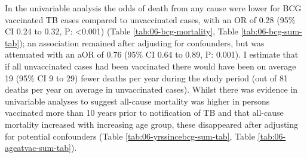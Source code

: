 \documentclass[11pt,twoside]{bristolthesis}
\begin{document}
  In the univariable analysis the odds of death from any cause were lower for BCG vaccinated TB cases compared to unvaccinated cases, with an OR of 0.28 (95\% CI 0.24 to 0.32, P: \textless{}0.001) (Table \ref{tab:06-bcg-mortality}, Table \ref{tab:06-bcg-sum-tab}); an association remained after adjusting for confounders, but was attenuated with an aOR of 0.76 (95\% CI 0.64 to 0.89, P: 0.001). I estimate that if all unvaccinated cases had been vaccinated there would have been on average 19 (95\% CI 9 to 29) fewer deaths per year during the study period (out of 81 deaths per year on average in unvaccinated cases). Whilst there was evidence in univariable analyses to suggest all-cause mortality was higher in persons vaccinated more than 10 years prior to notification of TB and that all-cause mortality increased with increasing age group, these disappeared after adjusting for potential confounders (Table \ref{tab:06-yrssincebcg-sum-tab}, Table \ref{tab:06-ageatvac-sum-tab}).
  
\end{document}
